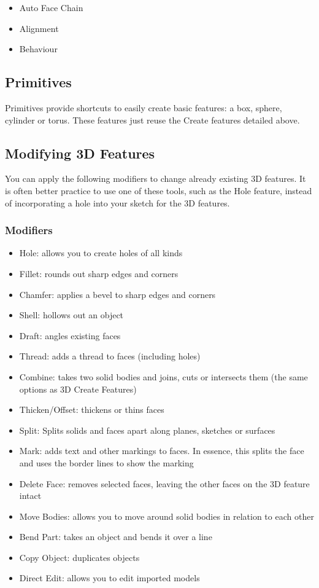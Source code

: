 \begin{itemize}
\item Auto Face Chain
\item Alignment
\item Behaviour
\end{itemize}

\subsection{Primitives}
Primitives provide shortcuts to easily create basic features: a box, sphere, cylinder or torus. These features just reuse the Create features detailed above.

\subsection{Modifying 3D Features}

You can apply the following modifiers to change already existing 3D features. It is often better practice to use one of these tools, such as the Hole feature, instead of incorporating a hole into your sketch for the 3D features.

\subsubsection{Modifiers}

\begin{itemize}
\item Hole: allows you to create holes of all kinds
\item Fillet: rounds out sharp edges and corners
\item Chamfer: applies a bevel to sharp edges and corners
\item Shell: hollows out an object
\item Draft: angles existing faces
\item Thread: adds a thread to faces (including holes)
\item Combine: takes two solid bodies and joins, cuts or intersects them (the same options as 3D Create Features)
\item Thicken/Offset: thickens or thins faces 
\item Split: Splits solids and faces apart along planes, sketches or surfaces
\item Mark: adds text and other markings to faces. In essence, this splits the face and uses the border lines to show the marking
\item Delete Face: removes selected faces, leaving the other faces on the 3D feature intact
\item Move Bodies: allows you to move around solid bodies in relation to each other
\item Bend Part: takes an object and bends it over a line
\item Copy Object: duplicates objects
\item Direct Edit: allows you to edit imported models
\end{itemize}

